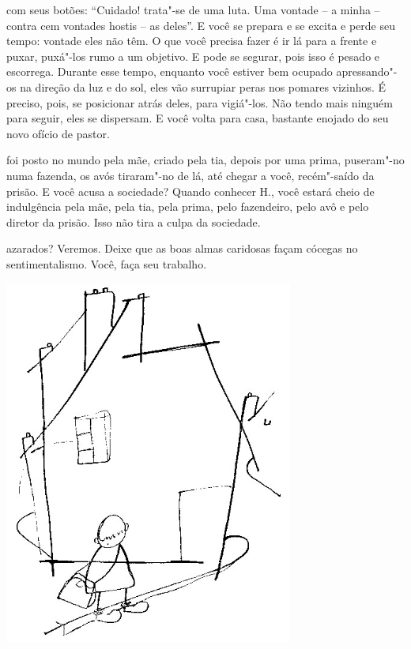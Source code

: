 
\pagebreak

 com seus botões: ``Cuidado! trata"-se de uma luta. Uma vontade -- a
minha -- contra cem vontades hostis -- as deles''. E você se prepara e
se excita e perde seu tempo: vontade eles não têm. O que você precisa
fazer é ir lá para a frente e puxar, puxá"-los rumo a um objetivo. E pode
se segurar, pois isso é pesado e escorrega. Durante esse tempo, enquanto
você estiver bem ocupado apressando"-os na direção da luz e do sol, eles
vão surrupiar peras nos pomares vizinhos. É preciso, pois, se posicionar
atrás deles, para vigiá"-los. Não tendo mais ninguém para seguir, eles se
dispersam. E você volta para casa, bastante enojado do seu novo ofício
de pastor.



 foi posto no mundo pela mãe, criado pela tia, depois por uma prima,
puseram"-no numa fazenda, os avós tiraram"-no de lá, até chegar a você,
recém"-saído da prisão. E você acusa a sociedade? Quando conhecer H.,
você estará cheio de indulgência pela mãe, pela tia, pela prima, pelo
fazendeiro, pelo avô e pelo diretor da prisão. Isso não tira a culpa da
sociedade.



 azarados? Veremos. Deixe que as boas almas caridosas façam
cócegas no sentimentalismo. Você, faça seu trabalho.


\pagebreak
\thispagestyle{empty}

\begin{vplace}[.50]
\begin{center}
\includegraphics[width=95mm]{./imgs/Image_3.jpg}
\end{center}
\end{vplace}

